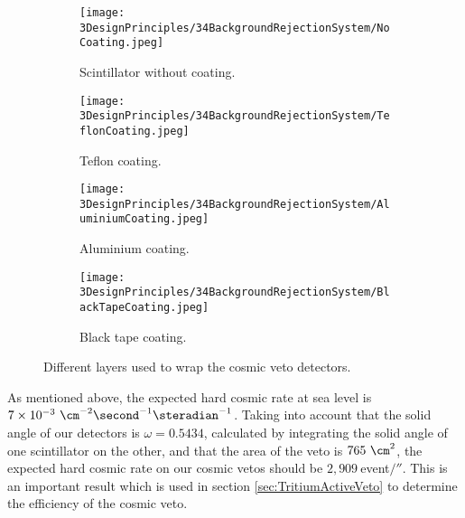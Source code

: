 \begin{figure}[h]
\centering
    \begin{subfigure}[b]{0.23\textwidth}
    \centering
    \texttt{[image: 3DesignPrinciples/34BackgroundRejectionSystem/NoCoating.jpeg]}  
    \caption{Scintillator without coating.\label{subfig:PlasticScintillatorNoCoating}}
    \end{subfigure}
    \hfill
    \begin{subfigure}[b]{0.23\textwidth}
    \centering
    \texttt{[image: 3DesignPrinciples/34BackgroundRejectionSystem/TeflonCoating.jpeg]}  
    \caption{Teflon coating.\label{subfig:PlasticScintillatorTeflon}}
    \end{subfigure}
    \hfill
    \begin{subfigure}[b]{0.23\textwidth}
    \centering
    \texttt{[image: 3DesignPrinciples/34BackgroundRejectionSystem/AluminiumCoating.jpeg]}  
    \caption{Aluminium coating.\label{subfig:PlasticScintillatorAluminium}}
    \end{subfigure}
    \hfill
    \begin{subfigure}[b]{0.23\textwidth}
    \centering
    \texttt{[image: 3DesignPrinciples/34BackgroundRejectionSystem/BlackTapeCoating.jpeg]}  
    \caption{Black tape coating.\label{subfig:PlasticScintillatorBlackTape}}
    \end{subfigure}
 \caption{Different layers used to wrap the cosmic veto detectors.}
 \label{fig:LayersVeto}
\end{figure}

As mentioned above, the expected hard cosmic rate at sea level is $7 \times 10^{-3}~\cm^{-2}\second^{-1}\steradian^{-1}$. Taking into account that the solid angle of our detectors is $\omega=0.5434$, calculated by integrating the solid angle of one scintillator on the other, and that the area of the veto is $765~\cm^2$, the expected hard cosmic rate on our cosmic vetos should be $2,909~$event$/\second$. This is an important result which is used in section \ref{sec:TritiumActiveVeto} to determine the efficiency of the cosmic veto.
